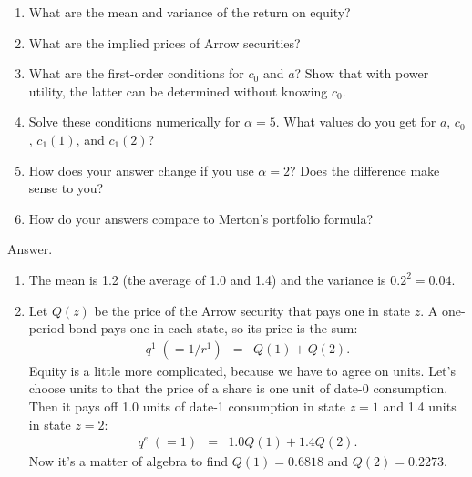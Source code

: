 \documentclass[11pt]{article}
\begin{document}
\begin{enumerate}
\begin{enumerate}
\item What are the mean and variance of the return on equity?
\item What are the implied prices of Arrow securities?
\item What are the first-order conditions for $c_0$ and $a$?
Show that with power utility,
the latter can be determined without knowing $c_0$.
\item Solve these conditions numerically for $\alpha = 5$.
What values do you get for $a$, $c_0$, $c_1(1)$, and $c_1(2)$?
\item How does your answer change if you use $\alpha = 2$?
Does the difference make sense to you?
\item How do your answers compare to Merton's portfolio formula?
\end{enumerate}
%
Answer.
\begin{enumerate}
\item The mean is 1.2 (the average of 1.0 and 1.4)
and the variance is $0.2^2 = 0.04$.

\item
Let $Q(z)$ be the price of the Arrow security that pays one
in state $z$.
A one-period bond pays one in each state, so its price is the sum:
\begin{eqnarray*}
    q^1 \; (=1/r^1)  &=&  Q(1) + Q(2)  .
\end{eqnarray*}
Equity is a little more complicated, because we have to agree on
units.  Let's choose units to that the price of a share is one
unit of date-0 consumption.
Then it pays off 1.0 units of date-1 consumption in state $z=1$
and 1.4 units in state $z=2$:
\begin{eqnarray*}
    q^e \; (=1)  &=&  1.0 Q(1) + 1.4 Q(2)  .
\end{eqnarray*}
Now it's a matter of algebra to find
$Q(1) = 0.6818$ and $Q(2) = 0.2273$.



\end{enumerate}
\end{enumerate}
\end{document}
